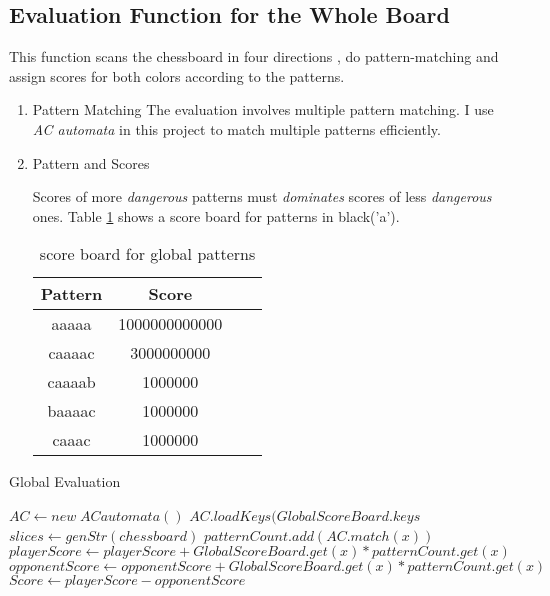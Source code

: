 \documentclass[conference]{IEEEtran}
\begin{document}
\subsection{Evaluation Function for the Whole Board}
This function scans the chessboard in four directions , do pattern-matching and assign scores for both colors according to the patterns. 
\begin{enumerate}
	\item Pattern Matching
        The evaluation involves multiple pattern matching. I use \emph{AC automata}\cite{ac} in this project to match multiple patterns efficiently.
	
	\item Pattern and Scores
	
	Scores of more \emph{dangerous} patterns must \emph{dominates} scores of less \emph{dangerous} ones. Table \ref{table:1} shows a score board for patterns in black('a').

	\begin{table}[H]
	\caption{score board for global patterns}
	\centering
    \begin{tabular}{cccc}
    \toprule
    Pattern&Score\\
    \midrule
	aaaaa&1000000000000\\
	caaaac&3000000000\\
	caaaab&1000000\\
	baaaac&1000000\\
	caaac&1000000\\
	\bottomrule
	\end{tabular}
	\label{table:1}
	\end{table}
\end{enumerate}

\begin{algorithm}[H]
    \caption{Global Evaluation}
\begin{algorithmic}[1]
    \State $AC \gets new\; ACautomata()$
    \State $AC.loadKeys(GlobalScoreBoard.keys$
    \State $slices \gets genStr(chessboard)$
        \State $patternCount.add(AC.match(x))$
    \EndFor
        \State $playerScore \gets playerScore + GlobalScoreBoard.get(x) * patternCount.get(x)$
        \Else
        \State $opponentScore \gets opponentScore + Global ScoreBoard.get(x) * patternCount.get(x)$
        \EndIf
    \EndFor
    \State $Score \gets playerScore - opponentScore$
\end{algorithmic}
\end{algorithm}
\end{document}
